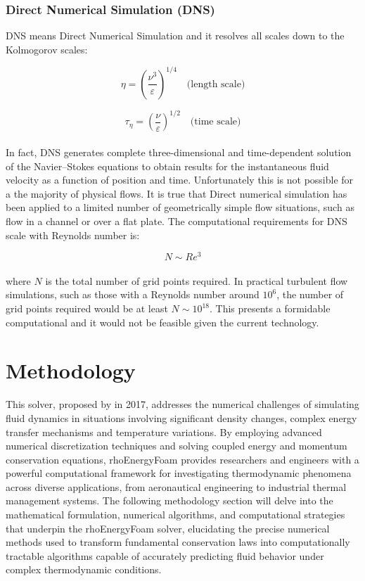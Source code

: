 \documentclass[a5paper]{sapthesis}
\begin{document}
	\subsection{Direct Numerical Simulation (DNS)}
	DNS means Direct Numerical Simulation and it resolves all scales down to the Kolmogorov scales:
	
	\begin{equation}
		\eta = \left(\frac{\nu^3}{\varepsilon}\right)^{1/4} \quad \text{(length scale)}
	\end{equation}
	
	\begin{equation}
		\tau_\eta = \left(\frac{\nu}{\varepsilon}\right)^{1/2} \quad \text{(time scale)}
	\end{equation}
	\\
	In fact, DNS generates complete three-dimensional and time-dependent solution of the Navier–Stokes equations to obtain results for the instantaneous fluid velocity as a function of position and time. Unfortunately this is not possible for a the majority of physical flows. It is true that Direct numerical simulation has been applied to a limited number of geometrically simple flow situations, such as flow in a channel or over a flat plate. 
	The computational requirements for DNS scale with Reynolds number is:
	
	\begin{equation}
		N \sim Re^3
	\end{equation}
	\\
	where $N$ is the total number of grid points required. In practical turbulent flow simulations, such as those with a Reynolds number around $10^6$, the number of grid points required would be at least $N\sim 10^{18}$. This presents a formidable computational and it would not be feasible given the current technology.
		
	\chapter{Methodology}
	\label{chap:methodology}
    This solver, proposed by \citet{rhoEnergyFoam} in 2017, addresses the numerical challenges of simulating fluid dynamics in situations involving significant density changes, complex energy transfer mechanisms and temperature variations. By employing advanced numerical discretization techniques and solving coupled energy and momentum conservation equations, rhoEnergyFoam provides researchers and engineers with a powerful computational framework for investigating thermodynamic phenomena across diverse applications, from aeronautical engineering to industrial thermal management systems. The following methodology section will delve into the mathematical formulation, numerical algorithms, and computational strategies that underpin the rhoEnergyFoam solver, elucidating the precise numerical methods used to transform fundamental conservation laws into computationally tractable algorithms capable of accurately predicting fluid behavior under complex thermodynamic conditions.
	
\end{document}
